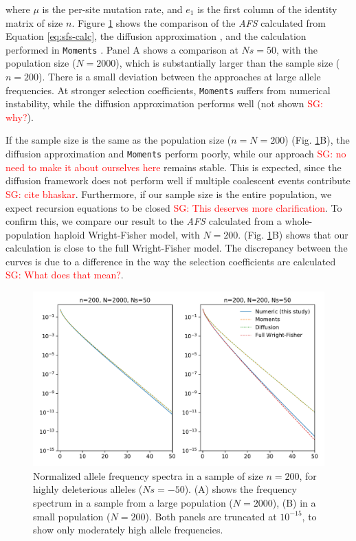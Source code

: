 \documentclass[review]{elsarticle}
\newcommand{\sgcomment}[1]{\textcolor{red}{SG: #1}}
\begin{document}
where $\mu$ is the per-site mutation rate, and $e_1$ is the first column of the identity matrix of
size $n$. Figure \ref{fig:strong-selection} shows the comparison of the \textit{AFS} calculated from
Equation \eqref{eq:sfs-calc}, the diffusion approximation \cite[eq. 9.23]{Ewens2004}, and the
calculation performed in \texttt{Moments} \citep{JouganousEtAl2017}. Panel A shows a comparison at
$Ns=50$, with the population size ($N=2000$), which is substantially larger than the sample size
($n=200$). There is a small deviation between the approaches at large allele frequencies. At
stronger selection coefficients, \texttt{Moments} suffers from numerical instability, while the
diffusion approximation performs well (not shown \sgcomment{why?}).

If the sample size is the same as the population size ($n=N=200$) (Fig.
\ref{fig:strong-selection}B), the diffusion approximation and \texttt{Moments} perform poorly, while
our approach \sgcomment{no need to make it about ourselves here} remains stable. This is expected, since the diffusion framework does not perform well
if multiple coalescent events contribute \sgcomment{cite bhaskar}. Furthermore, if our sample size is the entire population,
we expect recursion equations to be closed \sgcomment{This deserves more clarification}. To confirm this, we compare our result to the
\textit{AFS} calculated from a whole-population haploid Wright-Fisher model, with $N=200$. (Fig.
\ref{fig:strong-selection}B) shows that our calculation is close to the full Wright-Fisher model.
The discrepancy between the curves is due to a difference in the way the selection coefficients are
calculated \sgcomment{What does that mean?}.

\begin{figure}
  \centering
  \includegraphics[width=0.7\textheight]{fig/strong_selection.pdf}
  \caption{Normalized allele frequency spectra in a sample of size $n=200$, for highly deleterious
    alleles ($Ns=-50$). (A) shows the frequency spectrum in a sample from a large population
    ($N=2000$), (B) in a small population ($N=200$). Both panels are truncated at $10^{-15}$, to
    show only moderately high allele frequencies.}
  \label{fig:strong-selection}
\end{figure}
\end{document}
